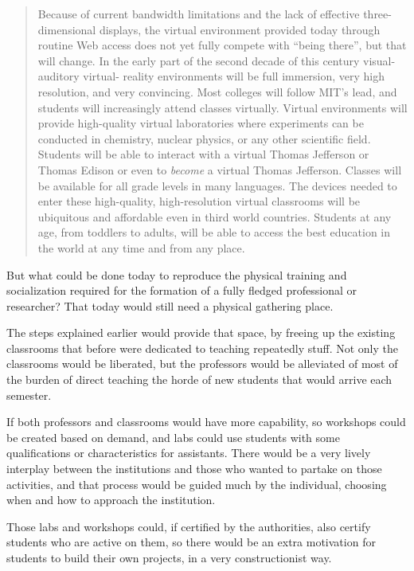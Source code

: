\begin{quotation}
    Because of current bandwidth limitations and the lack of effective
    three-dimensional displays, the virtual environment provided today through
    routine Web access does not yet fully compete with ``being there'', but that
    will change. In the early part of the second decade of this century
    visual-auditory virtual- reality environments will be full immersion, very
    high resolution, and very convincing. Most colleges will follow MIT's lead,
    and students will increasingly attend classes virtually. Virtual
    environments will provide high-quality virtual laboratories where
    experiments can be conducted in chemistry, nuclear physics, or any other
    scientific field. Students will be able to interact with a virtual Thomas
    Jefferson or Thomas Edison or even to \textit{become} a virtual Thomas
    Jefferson. Classes will be available for all grade levels in many languages.
    The devices needed to enter these high-quality, high-resolution virtual
    classrooms will be ubiquitous and affordable even in third world countries.
    Students at any age, from toddlers to adults, will be able to access the
    best education in the world at any time and from any place.
\end{quotation}

But what could be done today to reproduce the physical training and
socialization required for the formation of a fully fledged professional or
researcher? That today would still need a physical gathering place. 

The steps explained earlier would provide that space, by freeing up the existing
classrooms that before were dedicated to teaching repeatedly stuff. Not only the
classrooms would be liberated, but the professors would be alleviated of most of
the burden of direct teaching the horde of new students that would arrive each
semester.   

If both professors and classrooms would have more capability, so workshops could
be created based on demand, and labs could use students with some
qualifications or characteristics for assistants. There would be a very lively
interplay between the institutions and those who wanted to partake on those
activities, and that process would be guided much by the individual, choosing
when and how to approach the institution. 

Those labs and workshops could, if certified by the authorities, also certify
students who are active on them, so there would be an extra motivation for
students to build their own projects, in a very constructionist way.

